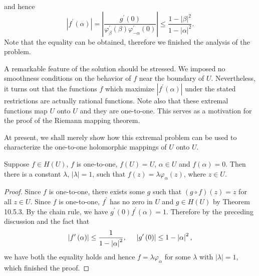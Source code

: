and hence 
$$
\left| f^{\prime}\left( \alpha \right) \right|=\left| \frac{g^{\prime}\left( 0 \right)}{\varphi _{\beta}^{\prime}\left( \beta \right) \varphi _{-\alpha}^{\prime}\left( 0 \right)} \right|\le \frac{1-\left| \beta \right|^2}{1-\left| \alpha \right|^2}.
$$
Note that the equality can be obtained, therefore we finished the analysis of the problem.\par
A remarkable feature of the solution should be stressed. We imposed no smoothness conditions on the behavior of $f$ near the boundary of $U$. Nevertheless, it turns out that the functions $f$ which maximize $|f^\prime(\alpha)|$ under the stated restrictions are actually rational functions. Note also that these extremal functions map $U$ onto $U$ and they are one-to-one. This serves as a motivation for the proof of the Riemann mapping theorem.\par
At present, we shall merely show how this extremal problem can be used to characterize the one-to-one holomorphic mappings of $U$ onto $U$.
\begin{theorem}
Suppose $f\in H(U)$, $f$ is one-to-one, $f(U)=U$, $\alpha\in U$ and $f(\alpha)=0$. Then there is a constant $\lambda$, $|\lambda|=1$, such that $f(z)=\lambda\varphi_\alpha(z)$, where $z\in U$.
\end{theorem}
\begin{proof}
Since $f$ is one-to-one, there exists some $g$ such that $(g\circ f)(z)=z$ for all $z\in U$. Since $f$ is one-to-one, $f^\prime$ has no zero in $U$ and $g\in H(U)$ by Theorem 10.5.3. By the chain rule, we have $g^\prime(0)f^\prime(\alpha)=1$. Therefore by the preceding discussion and the fact that 
$$
\left| f^{\prime}\left( \alpha \right) \right|\le \frac{1}{1-\left| \alpha \right|^2},\hspace{0.5cm}\left| g^{\prime}\left( 0 \right) \right|\le 1-\left| \alpha \right|^2,
$$
we have both the equality holds and hence $f=\lambda\varphi_\alpha$ for some $\lambda$ with $|\lambda|=1$, which finished the proof.
\end{proof}
